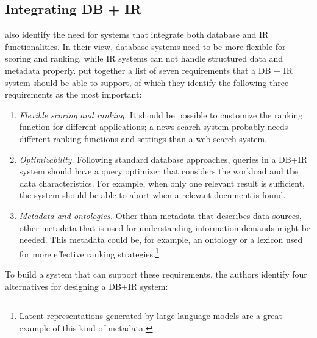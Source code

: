 \subsection{Integrating DB + IR}
 also identify the need for systems that integrate both database and IR functionalities. In their view, database systems need to be more flexible for scoring and ranking, while IR systems can not handle structured data and metadata properly.  put together a list of seven requirements that a DB + IR system should be able to support, of which they identify the following three requirements as the most important:
\begin{enumerate}
	\item \emph{Flexible scoring and ranking.}
	It should be possible to customize the ranking function for different applications; a news search system probably needs different ranking functions and settings than a web search system. 
	\item \emph{Optimizability.}
	Following standard database approaches, queries in a DB+IR system should have a query optimizer that considers the workload and the data characteristics. For example, when only one relevant result is sufficient, the system should be able to abort when a relevant document is found. 
	\item \emph{Metadata and ontologies.}
	Other than metadata that describes data sources, other metadata that is used for understanding information demands might be needed. This metadata could be, for example, an ontology or a lexicon used for more effective ranking strategies.\footnote{Latent representations generated by large language models are a great example of this kind of metadata.}
\end{enumerate}
To build a system that can support these requirements, the authors identify four alternatives for designing a DB+IR system:
